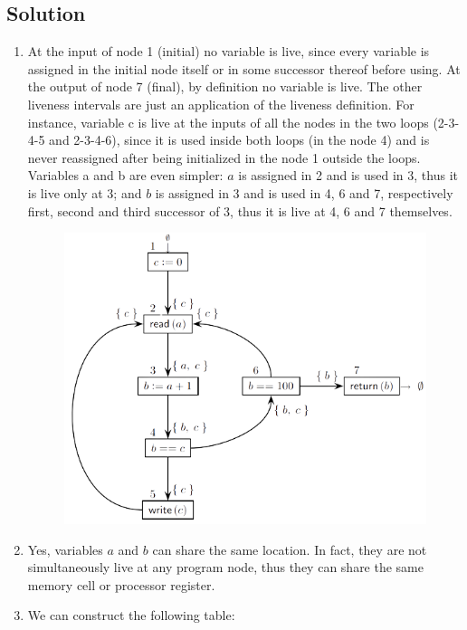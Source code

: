 \documentclass[12pt, a4paper]{report}
\newtheorem[style=M, bodystyle=\normalfont]{theorem}{Theorem}
\newtheorem[style=M, bodystyle=\normalfont]{corollary}{Corollary}
\newtheorem[style=M, bodystyle=\normalfont]{lemma}{Lemma}
\newtheorem[style=M, bodystyle=\normalfont]{definition}{Definition}
\begin{document}
    \subsection*{Solution}
        \begin{enumerate}
            \item At the input of node 1 (initial) no variable is live, since every variable is assigned in the initial node itself or in some successor thereof before using.
                At the output of node 7 (final), by definition no variable is live. The other liveness intervals are just an application of the liveness definition. 
                For instance, variable c is live at the inputs of all the nodes in the two loops (2-3-4-5 and 2-3-4-6), since it is used inside both loops (in the node 4) 
                and is never reassigned after being initialized in the node 1 outside the loops. Variables a and b are even simpler: $a$ is assigned in 2 and is used in 3,
                thus it is live only at 3; and $b$ is assigned in 3 and is used in 4, 6 and 7, respectively first, second and third successor of 3, thus it is live at 4, 6 
                and 7 themselves.
                \begin{figure}[H]
                    \centering
                    \includegraphics[width=0.75\linewidth]{images/CFGlive.png}
                \end{figure} 
            \item Yes, variables $a$ and $b$ can share the same location. In fact, they are not simultaneously live at any program node, thus they can share the same 
                memory cell or processor register.
            \item We can construct the following table: 
                \begin{table}[H]

\end{table}
\end{enumerate}
\end{document}
